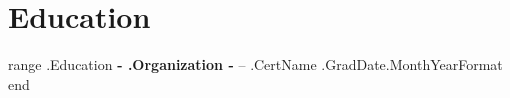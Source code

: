 \documentclass[10pt,letterpaper]{article}
\begin{document}




\section*{Education}
{{range .Education}}
\textbf{ {{- .Organization -}} } -- {{.CertName}} \hfill {{.GradDate.MonthYearFormat}} \\
{{end}}
\end{document}
